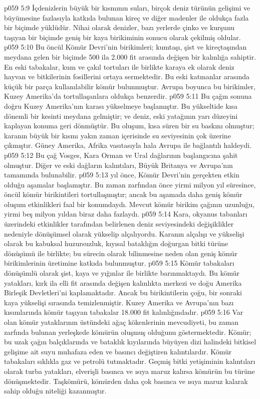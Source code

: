 \vs p059 5:9 İçdenizlerin büyük bir kısmının suları, birçok deniz türünün gelişimi ve büyümesine fazlasıyla katkıda bulunan kireç ve diğer madenler ile oldukça fazla bir biçimde yüklüdür. Nihai olarak denizler, bazı yerlerde çinko ve kurşunu taşıyan bir biçimde geniş bir kaya birikiminin sonucu olarak çekilmiş oldular.
\vs p059 5:10 Bu öncül Kömür Devri’nin birikimleri; kumtaşı, şist ve kireçtaşından meydana gelen bir biçimde 500 ila 2.000 fit arasında değişen bir kalınlığa sahiptir. En eski tabakalar, kum ve çakıl tortuları ile birlikte karaya ek olarak deniz hayvan ve bitkilerinin fosillerini ortaya sermektedir. Bu eski katmanlar arasında küçük bir parça kullanılabilir kömür bulunmuştur. Avrupa boyunca bu birikimler, Kuzey Amerika’da tortullaşanlara oldukça benzerdir.
\vs p059 5:11 Bu çağın sonuna doğru Kuzey Amerika’nın karası yükselmeye başlamıştır. Bu yükseltide kısa dönemli bir kesinti meydana gelmiştir; ve deniz, eski yatağının yarı düzeyini kaplayan konuma geri dönmüştür. Bu oluşum, kısa süren bir su baskını olmuştur; karanın büyük bir kısmı yakın zaman içerisinde su seviyesinin çok üzerine çıkmıştır. Güney Amerika, Afrika vasıtasıyla hala Avrupa ile bağlantılı haldeydi.
\vs p059 5:12 Bu çağ Vosges, Kara Orman ve Ural dağlarının başlangıcına şahit olmuştur. Diğer ve eski dağların kalıntıları, Büyük Britanya ve Avrupa’nın tamamında bulunabilir.
\vs p059 5:13  yıl önce, Kömür Devri’nin gerçekten etkin olduğu aşamalar başlamıştır. Bu zaman zarfından önce yirmi milyon yıl süresince, öncül kömür birikintileri tortullaşmıştır; ancak bu aşamada daha geniş kömür oluşum etkinlikleri faal bir konumdaydı. Mevcut kömür birikim çağının uzunluğu, yirmi beş milyon yıldan biraz daha fazlaydı.
\vs p059 5:14 Kara, okyanus tabanları üzerindeki etkinlikler tarafından belirlenen deniz seviyesindeki değişiklikler nedeniyle dönüşümsel olarak yükselip alçalıyordu. Karanın alçalışı ve yükselişi olarak bu kabuksal huzursuzluk, kıyısal bataklığın doğurgan bitki türüne dönüşümü ile birlikte; bu sürecin  olarak bilinmesine neden olan geniş kömür birikimlerinin üretimine katkıda bulunmuştur.
\vs p059 5:15 Kömür tabakaları dönüşümlü olarak şist, kaya ve yığınlar ile birlikte barınmaktaydı. Bu kömür yatakları, kırk ila elli fit arasında değişen kalınlıkta merkezi ve doğu Amerika Birleşik Devletleri’ni kaplamaktadır. Ancak bu birikintilerin çoğu, bir sonraki kaya yükselişi sırasında temizlenmiştir. Kuzey Amerika ve Avrupa’nın bazı kısımlarında kömür taşıyan tabakalar 18.000 fit kalınlığındadır.
\vs p059 5:16 Var olan kömür yataklarının üstündeki ağaç kökenlerinin mevcudiyeti, bu zaman zarfında bulunan yerleşkede kömürün oluşmuş olduğunu göstermektedir. Kömür; bu uzak çağın balçıklarında ve bataklık kıyılarında büyüyen dizi halindeki bitkisel gelişime ait suyu muhafaza eden ve basıncı değiştiren kalıntılardır. Kömür tabakaları sıklıkla gaz ve petrolü tutmaktadır. Geçmiş bitki yetişiminin kalıntıları olarak turba yatakları, elverişli basınca ve ısıya maruz kalırsa kömürün bu türüne dönüşmektedir. Taşkömürü, kömürden daha çok basınca ve ısıya maruz kalarak sahip olduğu niteliği kazanmıştır.
